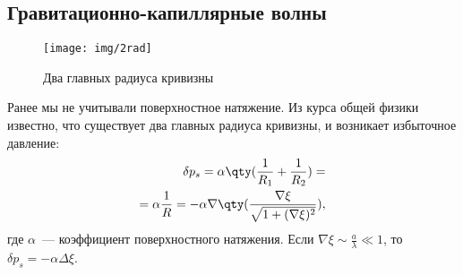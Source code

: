 

\newpage
\subsection{Гравитационно-капиллярные волны}
\begin{wrapfigure}[7]{l}{0.35\textwidth}
    \centering
    \vspace{-1em}
    \texttt{[image: img/2rad]}
    \caption{Два главных радиуса кривизны}
    \label{fig:2rad}
\end{wrapfigure}

Ранее мы не учитывали поверхностное натяжение.  Из курса общей физики известно, что существует два главных радиуса кривизны, и возникает избыточное давление:
\begin{equation}
    \begin{aligned}
        \delta p_s = \alpha\qty(\frac{1}{R_1}+\frac{1}{R_2}) =\\= \alpha \frac{1}{R} = -\alpha\nabla \qty(\frac{\nabla\xi}{\sqrt{1+(\nabla\xi)^2}}),
    \end{aligned}
\end{equation}
где $\alpha$~--- коэффициент поверхностного натяжения.
Если $\nabla\xi \sim \frac{a}{\lambda} \ll 1$, то $\delta p_s = -\alpha \Delta \xi$.


